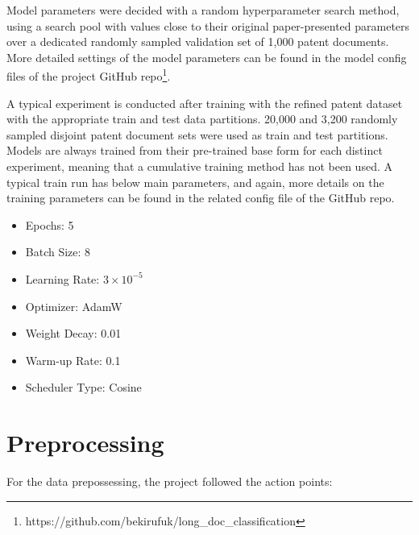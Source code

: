 \documentclass{iyte}
\begin{document}
Model parameters were decided with a random hyperparameter search method, using a search pool with values close to their original paper-presented parameters over a dedicated randomly sampled validation set of 1,000 patent documents. More detailed settings of the model parameters can be found in the model config files of the project GitHub repo\footnote{https://github.com/bekirufuk/long\_doc\_classification}.

A typical experiment is conducted after training with the refined patent dataset with the appropriate train and test data partitions. 20,000 and 3,200 randomly sampled disjoint patent document sets were used as train and test partitions. Models are always trained from their pre-trained base form for each distinct experiment, meaning that a cumulative training method has not been used. A typical train run has below main parameters, and again, more details on the training parameters can be found in the related config file of the GitHub repo. 

\begin{itemize}
  \item Epochs: 5
  \item Batch Size: 8
  \item Learning Rate: $3\times10^{-5}$
  \item Optimizer: AdamW
  \item Weight Decay: 0.01
  \item Warm-up Rate: 0.1
  \item Scheduler Type: Cosine
\end{itemize}


\section{Preprocessing}

For the data prepossessing, the project followed the action points:
\end{document}
